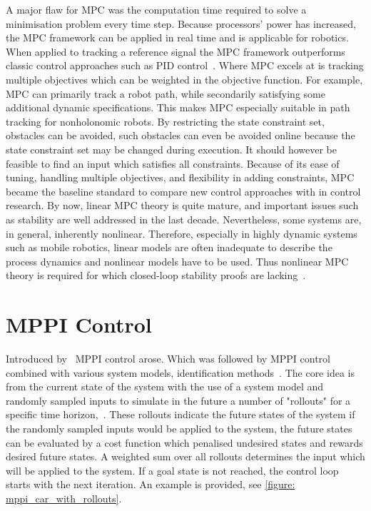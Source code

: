 A major flaw for \ac{MPC} was the computation time required to solve a minimisation problem every time step. Because processors' power has increased, the \ac{MPC} framework can be applied in real time and is applicable for robotics. When applied to tracking a reference signal the \ac{MPC} framework outperforms classic control approaches such as PID control~\cite{nascimento_nonholonomic_2018}. Where \ac{MPC} excels at is tracking multiple objectives which can be weighted in the objective function. For example, \ac{MPC} can primarily track a robot path, while secondarily satisfying some additional dynamic specifications. This makes \ac{MPC} especially suitable in path tracking for nonholonomic robots. By restricting the state constraint set, obstacles can be avoided, such obstacles can even be avoided online  because the state constraint set may be changed during execution. It should however be feasible to find an input which satisfies all constraints. Because of its ease of tuning, handling multiple objectives, and flexibility in adding constraints, \ac{MPC} became the baseline standard to compare new control approaches with in control research. By now, linear \ac{MPC} theory is quite mature, and important issues
such as stability are well addressed in the last decade. Nevertheless, some systems are, in general,
inherently nonlinear. Therefore, especially in highly dynamic systems such as mobile robotics, linear
models are often inadequate to describe the process dynamics and nonlinear models have to be used. Thus nonlinear \ac{MPC} theory is required for which closed-loop stability proofs are lacking~\cite{nascimento_nonholonomic_2018}. \\


\section{\ac{MPPI} Control}
Introduced by~\cite{williams_model_2015} \ac{MPPI} control arose. Which was followed by \ac{MPPI} control combined with various system models, identification methods~\cite{abraham_modelbased_2020,cong_selfadapting_2020,arruda_uncertainty_2017}. The core idea is from the current state of the system with the use of a system model and randomly sampled inputs to simulate in the future a number of "rollouts" for a specific time horizon,~\cite{neuromorphictutorial_ltc21_2021}. These rollouts indicate the future states of the system if the randomly sampled inputs would be applied to the system, the future states can be evaluated by a cost function which penalised undesired states and rewards desired future states. A weighted sum over all rollouts determines the input which will be applied to the system. If a goal state is not reached, the control loop starts with the next iteration. An example is provided, see  \cref{figure: mppi_car_with_rollouts}. 

